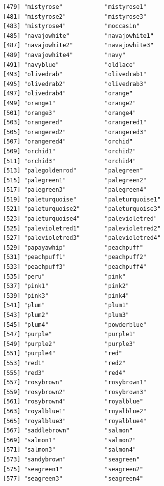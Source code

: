 \documentclass[a4paperpaper,]{article}
\begin{document}
\begin{verbatim}
[479] "mistyrose"            "mistyrose1"          
[481] "mistyrose2"           "mistyrose3"          
[483] "mistyrose4"           "moccasin"            
[485] "navajowhite"          "navajowhite1"        
[487] "navajowhite2"         "navajowhite3"        
[489] "navajowhite4"         "navy"                
[491] "navyblue"             "oldlace"             
[493] "olivedrab"            "olivedrab1"          
[495] "olivedrab2"           "olivedrab3"          
[497] "olivedrab4"           "orange"              
[499] "orange1"              "orange2"             
[501] "orange3"              "orange4"             
[503] "orangered"            "orangered1"          
[505] "orangered2"           "orangered3"          
[507] "orangered4"           "orchid"              
[509] "orchid1"              "orchid2"             
[511] "orchid3"              "orchid4"             
[513] "palegoldenrod"        "palegreen"           
[515] "palegreen1"           "palegreen2"          
[517] "palegreen3"           "palegreen4"          
[519] "paleturquoise"        "paleturquoise1"      
[521] "paleturquoise2"       "paleturquoise3"      
[523] "paleturquoise4"       "palevioletred"       
[525] "palevioletred1"       "palevioletred2"      
[527] "palevioletred3"       "palevioletred4"      
[529] "papayawhip"           "peachpuff"           
[531] "peachpuff1"           "peachpuff2"          
[533] "peachpuff3"           "peachpuff4"          
[535] "peru"                 "pink"                
[537] "pink1"                "pink2"               
[539] "pink3"                "pink4"               
[541] "plum"                 "plum1"               
[543] "plum2"                "plum3"               
[545] "plum4"                "powderblue"          
[547] "purple"               "purple1"             
[549] "purple2"              "purple3"             
[551] "purple4"              "red"                 
[553] "red1"                 "red2"                
[555] "red3"                 "red4"                
[557] "rosybrown"            "rosybrown1"          
[559] "rosybrown2"           "rosybrown3"          
[561] "rosybrown4"           "royalblue"           
[563] "royalblue1"           "royalblue2"          
[565] "royalblue3"           "royalblue4"          
[567] "saddlebrown"          "salmon"              
[569] "salmon1"              "salmon2"             
[571] "salmon3"              "salmon4"             
[573] "sandybrown"           "seagreen"            
[575] "seagreen1"            "seagreen2"           
[577] "seagreen3"            "seagreen4"           

\end{verbatim}
\end{document}
